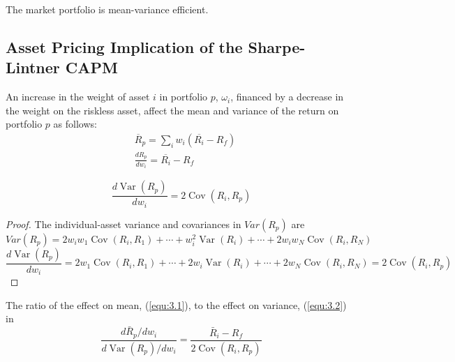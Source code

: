 \documentclass[11pt,green,twocol,citestyle=authoryear, bibstyle=authoryear]{elegantbook}
\begin{document}
\begin{note}
    The market portfolio is mean-variance efficient.
\end{note}

\subsection{Asset Pricing Implication of the Sharpe-Lintner CAPM}

An increase in the weight of asset $ i $ in portfolio $ p $, $ \omega_i $, financed by a decrease in the weight on the riskless asset, affect the mean and variance of the return on portfolio $ p $ as follows:
\begin{equation}\label{equ:3.1}
    \begin{aligned}
        &\overline{R}_p=\sum_i w_i\left(\overline{R_{i}}-R_f\right) \\
        &\frac{d R_p }{d w_i}=\overline{R_i}-R_f
        \end{aligned}
\end{equation}  

\begin{equation}\label{equ:3.2}
    \frac{d \operatorname{Var}\left(R_p\right)}{d w_i}=2 \operatorname{Cov}\left(R_i, R_p\right)
\end{equation} 

\begin{proof}
    The individual-asset variance and covariances in $ Var(R_p) $ are
\begin{equation*}
    Var(R_p)= 2 w_i w_1 \operatorname{Cov}\left(R_i, R_1\right)+\cdots+w_i^2 \operatorname{Var}\left(R_i\right)+\cdots+2 w_i w_N \operatorname{Cov}\left(R_i, R_N\right) 
\end{equation*} 
\begin{equation}\label{equ:3.3}
       \frac{d \operatorname{Var}\left(R_p\right)}{d w_i} = 2 w_1 \operatorname{Cov}\left(R_i, R_1\right)+\cdots+2 w_i \operatorname{Var}\left(R_i\right) +\cdots+2 w_N \operatorname{Cov}\left(R_i, R_N\right)=2 \operatorname{Cov}\left(R_i, R_p\right)
\end{equation}
\end{proof}

The ratio of the effect on mean, (\ref{equ:3.1}), to the effect on variance, (\ref{equ:3.2}) in
\begin{equation}\label{equ:3.4}
    \frac{d \bar{R}_p / d w_i}{d \operatorname{Var}\left(R_p\right) / d w_i}=\frac{\bar{R}_i-R_f}{2 \operatorname{Cov}\left(R_i, R_p\right)}
\end{equation}
\end{document}
